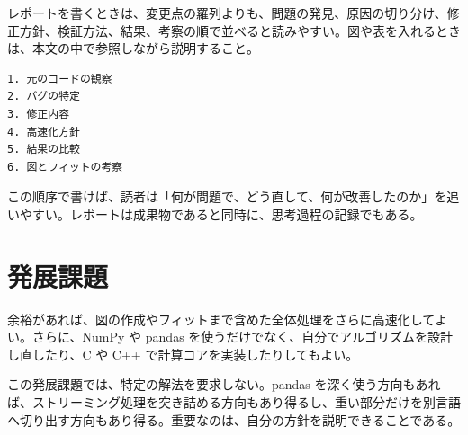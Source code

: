 レポートを書くときは、変更点の羅列よりも、問題の発見、原因の切り分け、修正方針、検証方法、結果、考察の順で並べると読みやすい。図や表を入れるときは、本文の中で参照しながら説明すること。

\begin{lstlisting}[numbers=none, xleftmargin=2\zw, caption={レポート構成の例}]
1. 元のコードの観察
2. バグの特定
3. 修正内容
4. 高速化方針
5. 結果の比較
6. 図とフィットの考察
\end{lstlisting}

この順序で書けば、読者は「何が問題で、どう直して、何が改善したのか」を追いやすい。レポートは成果物であると同時に、思考過程の記録でもある。

\section{発展課題}

余裕があれば、図の作成やフィットまで含めた全体処理をさらに高速化してよい。さらに、NumPy や pandas を使うだけでなく、自分でアルゴリズムを設計し直したり、C や C++ で計算コアを実装したりしてもよい。

この発展課題では、特定の解法を要求しない。pandas を深く使う方向もあれば、ストリーミング処理を突き詰める方向もあり得るし、重い部分だけを別言語へ切り出す方向もあり得る。重要なのは、自分の方針を説明できることである。
